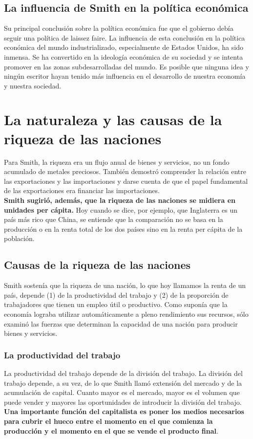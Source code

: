 \documentclass[10pt]{book}
\begin{document}
\subsection*{La influencia de Smith en la política económica}
Su principal conclusión sobre la política económica fue que el gobierno debía seguir una política de laissez faire. La influencia de esta conclusión en la política económica del mundo industrializado, especialmente de Estados Unidos, ha sido inmensa. Se ha convertido en la ideología económica de su sociedad y se intenta promover en las zonas subdesarrolladas del mundo. Es posible que ninguna idea y ningún escritor hayan tenido más influencia en el desarrollo de nuestra economía y nuestra sociedad.

\section*{La naturaleza y las causas de la riqueza de las naciones}
Para Smith, la riqueza era un flujo anual de bienes y servicios, no un fondo acumulado de metales preciosos. También demostró comprender la relación entre las exportaciones y las importaciones y darse cuenta de que el papel fundamental de las exportaciones era financiar las importaciones.\\
\textbf{Smith sugirió, además, que la riqueza de las naciones se midiera en unidades per cápita.} Hoy cuando se dice, por ejemplo, que Inglaterra es un país más rico que China, se entiende que la comparación no se basa en la producción o en la renta total de los dos países sino en la renta per cápita de la población.\\

\subsection*{Causas de la riqueza de las naciones}
Smith sostenía que la riqueza de una nación, lo que hoy llamamos la renta de un país, depende (1) de la productividad del trabajo y (2) de la proporción de trabajadores que tienen un empleo útil o productivo. Como suponía que la economía lograba utilizar automáticamente a pleno rendimiento sus recursos, sólo examinó las fuerzas que determinan la capacidad de una nación para producir bienes y servicios.

\subsubsection*{La productividad del trabajo} 
La productividad del trabajo depende de la división del trabajo. La división del trabajo depende, a su vez, de lo que Smith llamó extensión del mercado y de la acumulación de capital. Cuanto mayor es el mercado, mayor es el volumen que puede vender y mayores las oportunidades de introducir la división del trabajo.\\
\textbf{Una importante función del capitalista es poner los medios necesarios para cubrir el hueco entre el momento en el que comienza la producción y el momento en el que se vende el producto final}.\\
\end{document}
